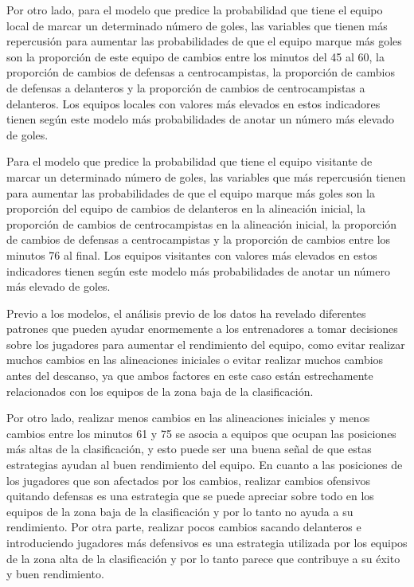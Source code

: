 Por otro lado, para el modelo que predice la probabilidad que tiene el equipo local de marcar un 
determinado número de goles, las variables que tienen más repercusión para aumentar las 
probabilidades de que el equipo marque más goles son la proporción de este equipo de cambios 
entre los minutos del 45 al 60, la proporción de cambios de defensas a centrocampistas, la 
proporción de cambios de defensas a delanteros y la proporción de cambios de centrocampistas a 
delanteros. Los equipos locales con valores más elevados en estos indicadores tienen según este 
modelo más probabilidades de anotar un número más elevado de goles.

Para el modelo que predice la probabilidad que tiene el equipo visitante de marcar un determinado
número de goles, las variables que más repercusión tienen para aumentar las probabilidades de 
que el equipo marque más goles son la proporción del equipo de cambios de delanteros en la 
alineación inicial, la proporción de cambios de centrocampistas en la alineación inicial, la 
proporción de cambios de defensas a centrocampistas y la proporción de cambios entre los 
minutos 76 al final. Los equipos visitantes con valores más elevados en estos indicadores tienen 
según este modelo más probabilidades de anotar un número más elevado de goles.

Previo a los modelos, el análisis previo de los datos ha revelado diferentes patrones que pueden 
ayudar enormemente a los entrenadores a tomar decisiones sobre los jugadores para aumentar el 
rendimiento del equipo, como evitar realizar muchos cambios en las alineaciones iniciales o evitar 
realizar muchos cambios antes del descanso, ya que ambos factores en este caso están 
estrechamente relacionados con los equipos de la zona baja de la clasificación. 

Por otro lado, realizar menos cambios en las alineaciones iniciales y menos cambios entre los 
minutos 61 y 75 se asocia a equipos que ocupan las posiciones más altas de la clasificación, y esto 
puede ser una buena señal de que estas estrategias ayudan al buen rendimiento del equipo.
En cuanto a las posiciones de los jugadores que son afectados por los cambios, realizar cambios 
ofensivos quitando defensas es una estrategia que se puede apreciar sobre todo en los equipos de 
la zona baja de la clasificación y por lo tanto no ayuda a su rendimiento. Por otra parte, realizar 
pocos cambios sacando delanteros e introduciendo jugadores más defensivos es una estrategia 
utilizada por los equipos de la zona alta de la clasificación y por lo tanto parece que contribuye a 
su éxito y buen rendimiento.

